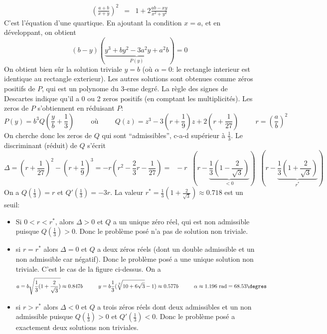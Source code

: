 \documentclass{article}
\begin{document}
\begin{eqnarray*}
\left(\frac{a+b}{x+y}\right)^2 & = & 1+2\frac{ab-xy}{x^2+y^2}
\end{eqnarray*}
C'est l'équation d'une quartique. En ajoutant la condition $x=a$, et en développant, on obtient
\[
(b-y)(\underbrace{y^3+by^2-3a^2y+a^2b}_{P(y)})=0
\]
On obtient bien sûr la solution triviale $y=b$ (où $\alpha=0$: le rectangle interieur est identique au rectangle exterieur). Les autres solutions sont obtenues comme zéros positifs de $P$, qui est un polynome du 3-eme degré. La règle des signes de Descartes indique qu'il a 0 ou 2 zeros positifs (en comptant les multiplicités). Les zeros de $P$ s'obtiennent en réduisant $P$:
\[
P(y) = b^3Q(\frac{y}{b}+\frac{1}{3})
\hspace{1cm}\textrm{où}\hspace{1cm}
Q(z)=z^3-3(r+\frac{1}{9})z+2(r+\frac{1}{27})
\hspace{1cm}
r=\left(\frac{a}{b}\right)^2
\]
On cherche donc les zeros de $Q$ qui sont ``admissibles'', c-a-d supérieur à $\frac{1}{3}$. Le discriminant (réduit) de $Q$ s'écrit
\[
\Delta = (r+\frac{1}{27})^2-(r+\frac{1}{9})^3=-r(r^2-\frac{2}{3}r-\frac{1}{27}) =
\;\;-r\;\;(r-\underbrace{\frac{1}{3}(1-\frac{2}{\sqrt{3}})}_{<0})\;\;(r-\underbrace{\frac{1}{3}(1+\frac{2}{\sqrt{3}})}_{r^*})
\]
On a $Q(\frac{1}{3})=r$ et $Q'(\frac{1}{3})=-3r$. La valeur $r^*=\frac{1}{3}(1+\frac{2}{\sqrt{3}})\approx0.718$ est un seuil:
\begin{itemize}
\item
Si $0<r<r^*$, alors $\Delta>0$ et $Q$ a un unique zéro réel, qui est non admissible puisque $Q(\frac{1}{3})>0$. Donc le problème posé n'a pas de solution non triviale.
\item
si $r=r^*$ alors $\Delta=0$ et $Q$ a deux zéros réels (dont un double admissible et un non admissible car négatif). Donc le problème posé a une unique solution non triviale. C'est le cas de la figure ci-dessus. On a
\[
a=b\sqrt{\frac{1}{3}(1+\frac{2}{\sqrt{3}})}\approx0.847b
\hspace{1cm}
y=b\frac{1}{3}(\sqrt[3]{10+6\sqrt{3}}-1)\approx0.577b
\hspace{1cm}
\alpha\approx1.196\textrm{ rad}=68.53\degres
\]
\item
si $r>r^*$ alors $\Delta<0$ et $Q$ a trois zéros réels dont deux admissibles et un non admissible puisque $Q(\frac{1}{3})>0$ et $Q'(\frac{1}{3})<0$. Donc le problème posé a exactement deux solutions non triviales.
\end{itemize}
\pagebreak
\end{document}
